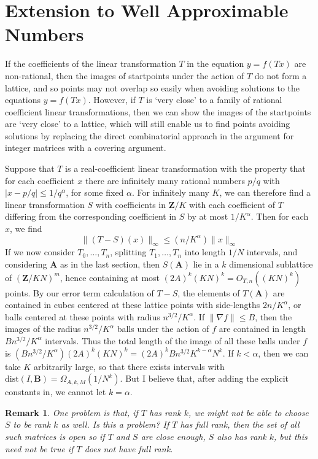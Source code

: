\documentclass{report}
\theoremstyle{plain}
\theoremstyle{plain}
\newtheorem*{remark}{Remark}
\begin{document}
\section{Extension to Well Approximable Numbers}

If the coefficients of the linear transformation $T$ in the equation $y = f(Tx)$ are non-rational, then the images of startpoints under the action of $T$ do not form a lattice, and so points may not overlap so easily when avoiding solutions to the equations $y = f(Tx)$. However, if $T$ is `very close' to a family of rational coefficient linear transformations, then we can show the images of the startpoints are `very close' to a lattice, which will still enable us to find points avoiding solutions by replacing the direct combinatorial approach in the argument for integer matrices with a covering argument.

Suppose that $T$ is a real-coefficient linear transformation with the property that for each coefficient $x$ there are infinitely many rational numbers $p/q$ with $|x - p/q| \leq 1/q^\alpha$, for some fixed $\alpha$. For infinitely many $K$, we can therefore find a linear transformation $S$ with coefficients in $\mathbf{Z}/K$ with each coefficient of $T$ differing from the corresponding coefficient in $S$ by at most $1/K^\alpha$. Then for each $x$, we find
%
\[ \| (T - S)(x) \|_\infty \leq (n/K^\alpha) \| x \|_\infty \]
%
If we now consider $T_0, \dots, T_n$, splitting $T_1, \dots, T_n$ into length $1/N$ intervals, and considering $\mathbf{A}$ as in the last section, then $S(\mathbf{A})$ lie in a $k$ dimensional sublattice of $(\mathbf{Z}/KN)^m$, hence containing at most $(2A)^k (KN)^k = O_{T,n}((KN)^k)$ points. By our error term calculation of $T-S$, the elements of $T(\mathbf{A})$ are contained in cubes centered at these lattice points with side-lengths $2n/K^\alpha$, or balls centered at these points with radius $n^{3/2}/K^\alpha$. If $\| \nabla f \| \leq B$, then the images of the radius $n^{3/2}/K^\alpha$ balls under the action of $f$ are contained in length $Bn^{3/2}/K^\alpha$ intervals. Thus the total length of the image of all these balls under $f$ is $(Bn^{3/2}/K^\alpha)(2A)^k(KN)^k = (2A)^k Bn^{3/2} K^{k-\alpha} N^k$. If $k < \alpha$, then we can take $K$ arbitrarily large, so that there exists intervals with $\text{dist}(I,\mathbf{B}) = \Omega_{A,k,M}(1/N^k)$. But I believe that, after adding the explicit constants in, we cannot let $k = \alpha$.

\begin{remark}
    One problem is that, if $T$ has rank $k$, we might not be able to choose $S$ to be rank $k$ as well. Is this a problem? If $T$ has full rank, then the set of all such matrices is open so if $T$ and $S$ are close enough, $S$ also has rank $k$, but this need not be true if $T$ does not have full rank.
\end{remark}
\end{document}
